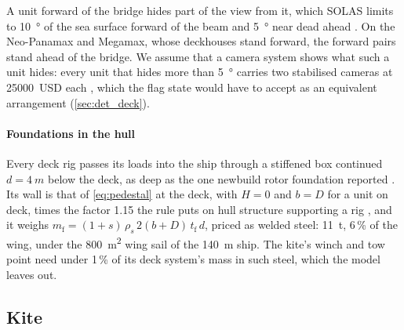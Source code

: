 A unit forward of the bridge hides part of the view from it, which SOLAS limits to \SI{10}{\degree} of the sea surface forward of the beam and \SI{5}{\degree} near dead ahead \citep{dma2019solas}. On the Neo-Panamax and Megamax, whose deckhouses stand forward, the forward pairs stand ahead of the bridge. We assume that a camera system shows what such a unit hides: every unit that hides more than \SI{5}{\degree} carries two stabilised cameras \citep{imo2012circ1350} at \SI{25000}{USD} each \citep{thegpsstore2026flir}, which the flag state would have to accept as an equivalent arrangement (\cref{sec:det_deck}).

\paragraph{Foundations in the hull} Every deck rig passes its loads into the ship through a stiffened box continued $d=\SI{4}{m}$ below the deck, as deep as the one newbuild rotor foundation reported \citep[p.~23]{wasp2023bpm}. Its wall is that of \cref{eq:pedestal} at the deck, with $H=0$ and $b=D$ for a unit on deck, times the factor 1.15 the rule puts on hull structure supporting a rig \citep[Sec.~8]{bv2026nr206}, and it weighs $m_\mathrm{f}=(1+s)\,\rho_s\,2(b+D)\,t_\mathrm{f}\,d$, priced as welded steel: \SI{11}{t}, 6\,\% of the wing, under the \SI{800}{m^2} wing sail of the \SI{140}{m} ship. The kite's winch and tow point need under 1\,\% of its deck system's mass in such steel, which the model leaves out.

\subsection{Kite}
\label{sec:kite}

